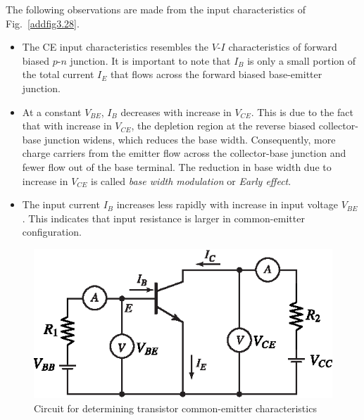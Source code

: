 \smallskip

The following observations are made from the input characteristics of Fig.~\ref{addfig3.28}.
\begin{itemize}
\item
The CE input characteristics resembles the $V$-$I$ characteristics of forward biased $p$-$n$ junction. It is important to note that $I_{B}$ is only a small portion of the total current $I_{E}$ that flows across the forward biased base-emitter junction.

\item
At a constant $V_{BE}$, $I_{B}$ decreases with increase in $V_{CE}$. This is due to the fact that with increase in $V_{CE}$, the depletion region at the reverse biased collector-base junction widens, which reduces the base width. Consequently, more charge carriers from the emitter flow across the collector-base junction and fewer flow out of the base terminal. The reduction in base width due to increase in $V_{CE}$ is called {\em base width modulation} or {\em Early effect}.

\item The input current $I_{B}$ increases less rapidly with increase in input voltage $V_{BE}$. This indicates that input resistance is larger in common-emitter configuration.
\end{itemize}

\begin{figure}[H]
\centering
\includegraphics[scale=1.1]{chap2/S3-EE-03-027.eps}
\smallskip
\caption{Circuit for determining transistor common-emitter characteristics}\label{fig3.27}
\end{figure}

\newpage

